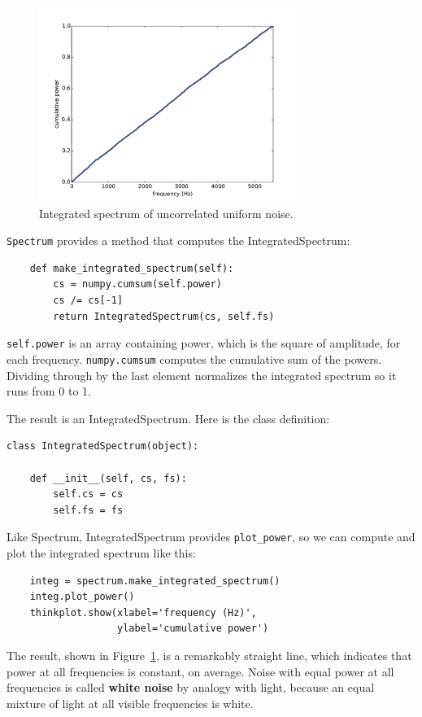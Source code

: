 \documentclass[12pt]{book}
\begin{document}
\begin{figure}
\centerline{\includegraphics[height=2.5in]{figs/whitenoise2.pdf}}
\caption{Integrated spectrum of uncorrelated uniform noise.}
\label{fig.noise2}
\end{figure}


{\tt Spectrum} provides a method that computes the IntegratedSpectrum:

\begin{verbatim}
    def make_integrated_spectrum(self):
        cs = numpy.cumsum(self.power)
        cs /= cs[-1]
        return IntegratedSpectrum(cs, self.fs)
\end{verbatim}

{\tt self.power} is an array containing power, which is the square
of amplitude, for each frequency.
{\tt numpy.cumsum} computes the cumulative sum of the powers.
Dividing through by the last element normalizes the integrated
spectrum so it runs from 0 to 1.

The result is an IntegratedSpectrum.  Here is the class definition:

\begin{verbatim}
class IntegratedSpectrum(object):
    
    def __init__(self, cs, fs):
        self.cs = cs
        self.fs = fs
\end{verbatim}

Like Spectrum, IntegratedSpectrum provides \verb"plot_power", so
we can compute and plot the integrated spectrum like this:

\begin{verbatim}
    integ = spectrum.make_integrated_spectrum()
    integ.plot_power()
    thinkplot.show(xlabel='frequency (Hz)',
                   ylabel='cumulative power')
\end{verbatim}

The result, shown in Figure~\ref{fig.noise2}, is a remarkably
straight line, which indicates that power at all
frequencies is constant, on average.  Noise with equal power
at all frequencies is called {\bf white noise} by analogy with light,
because an equal mixture
of light at all visible frequencies is white.
\end{document}
